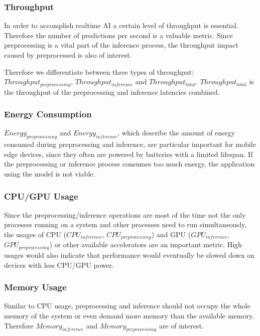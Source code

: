\subsubsection{Throughput}
In order to accomplish realtime AI a certain level of throughput is essential. Therefore the number of predictions per second is a valuable metric. 
Since preprocessing is a vital part of the inference process, the throughput impact caused by preprocessed is also of interest.

Therefore we differentiate between three types of throughput: $Throughput_{preprocessing}$, $Throughput_{inference}$ and $Throughput_{total}$.
$Throughput_{total}$ is the throughput of the preprocessing and inference latencies combined.



\subsubsection{Energy Consumption}
$Energy_{preprocessing}$ and $Energy_{inference}$, which describe the amount of energy consumed during preprocessing and inference, are particular important for mobile edge devices, since they often are powered by batteries with a limited lifespan. If the preprocessing or inference process consumes too much energy, the application using the model is not viable.


\subsubsection{CPU/GPU Usage}
Since the preprocessing/inference operations are most of the time not the only processes running on a system and other processes need to run simultaneously, the usages of CPU ($CPU_{inference}$, $CPU_{preprocessing}$) and GPU ($GPU_{inference}$, $GPU_{preprocessing}$) or other available accelerators are an important metric.
High usages would also indicate that performance would eventually be slowed down on devices with less CPU/GPU power.


\subsubsection{Memory Usage}
Similar to CPU usage, preprocessing and inference should not occupy the whole memory of the system or even demand more memory than the available memory. Therefore $Memory_{inference}$ and $Memory_{preprocessing}$ are of interest.

